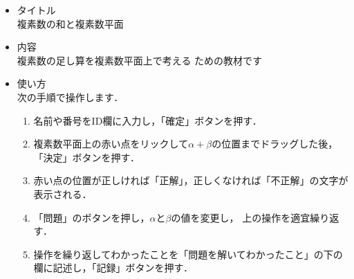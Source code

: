 \documentclass[20]{jarticle}
\begin{document}
\begin{itemize}
\item タイトル\\
複素数の和と複素数平面
\item 内容\\
複素数の足し算を複素数平面上で考える
ための教材です
\item 使い方\\
次の手順で操作します．
\begin{enumerate}[(1)]
\item 名前や番号をID欄に入力し，「確定」ボタンを押す．
\item 複素数平面上の赤い点をリックして$\alpha+\beta$の位置までドラッグした後，「決定」ボタンを押す．
\item 赤い点の位置が正しければ「正解」，正しくなければ「不正解」の文字が表示される．
\item 「問題」のボタンを押し，$\alpha$と$\beta$の値を変更し， 上の操作を適宜繰り返す．
\item 操作を繰り返してわかったことを「問題を解いてわかったこと」の下の欄に記述し，「記録」ボタンを押す．

\end{enumerate}

\end{itemize}
\end{document}
